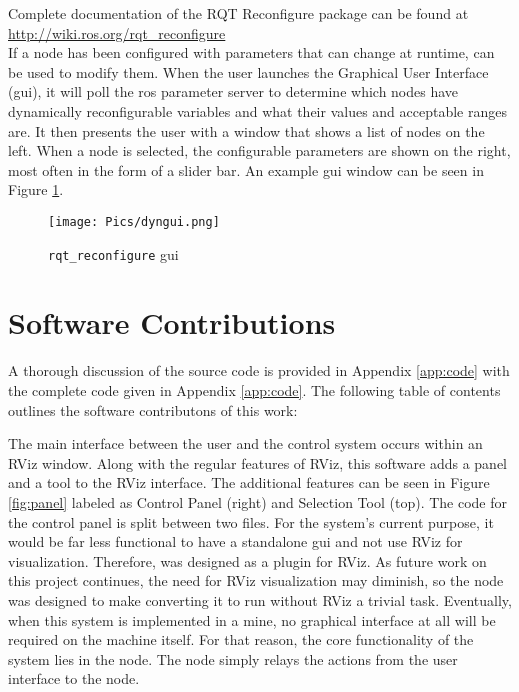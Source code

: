 Complete documentation of the RQT Reconfigure package can be found at \url{http://wiki.ros.org/rqt_reconfigure}\\

If a node has been configured with parameters that can change at runtime,  can be used to modify them. When the user launches the Graphical User Interface (\acrshort{gui}), it will poll the \acrshort{ros} parameter server to determine which nodes have dynamically reconfigurable variables and what their values and acceptable ranges are. It then presents the user with a window that shows a list of nodes on the left. When a node is selected, the configurable parameters are shown on the right, most often in the form of a slider bar. An example  \acrshort{gui} window can be seen in Figure \ref{fig:dyngui2}.

\begin{figure}[h]
    \centering
    \texttt{[image: Pics/dyngui.png]}
    \caption{\texttt{rqt\_reconfigure} \acrshort{gui}}
    \label{fig:dyngui2}
\end{figure}

\section{Software Contributions}
\label{sub:software}

A thorough discussion of the source code is provided in Appendix \ref{app:code} with the complete code given in Appendix \ref{app:code}. The following table of contents outlines the software contributons of this work:

\begin{minipage}{\textwidth}

\end{minipage}

The main interface between the user and the control system occurs within an RViz window. Along with the regular features of RViz, this software adds a panel and a tool to the RViz interface. The additional features can be seen in Figure \ref{fig:panel} labeled as Control Panel (right) and Selection Tool (top). The code for the control panel is split between two files. For the system's current purpose, it would be far less functional to have a standalone \acrshort{gui} and not use RViz for visualization. Therefore,  was designed as a plugin for RViz. As future work on this project continues, the need for RViz visualization may diminish, so the node was designed to make converting it to run without RViz a trivial task. Eventually, when this system is implemented in a mine, no graphical interface at all will be required on the machine itself. For that reason, the core functionality of the system lies in the  node. The  node simply relays the actions from the user interface to the  node.\\

